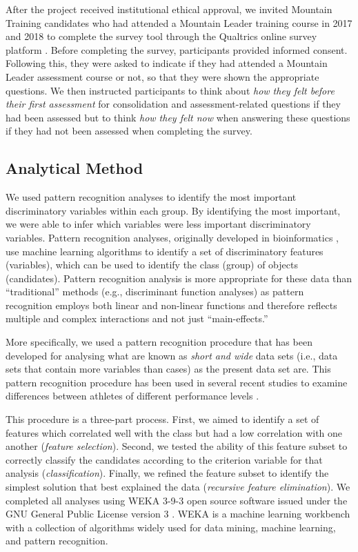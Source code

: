 \documentclass[
  12pt,
  a4paper,
]{book}
\begin{document}
After the project received institutional ethical approval, we invited Mountain Training candidates who had attended a Mountain Leader training course in 2017 and 2018 to complete the survey tool through the Qualtrics online survey platform \citep{Qualtrics}. Before completing the survey, participants provided informed consent. Following this, they were asked to indicate if they had attended a Mountain Leader assessment course or not, so that they were shown the appropriate questions. We then instructed participants to think about \emph{how they felt before their first assessment} for consolidation and assessment-related questions if they had been assessed but to think \emph{how they felt now} when answering these questions if they had not been assessed when completing the survey.

\hypertarget{pra-analytical-method}{%
\subsection{Analytical Method}\label{pra-analytical-method}}

We used pattern recognition analyses to identify the most important discriminatory variables within each group. By identifying the most important, we were able to infer which variables were less important discriminatory variables. Pattern recognition analyses, originally developed in bioinformatics \citep{Duda2000}, use machine learning algorithms to identify a set of discriminatory features (variables), which can be used to identify the class (group) of objects (candidates). Pattern recognition analysis is more appropriate for these data than ``traditional'' methods (e.g., discriminant function analyses) as pattern recognition employs both linear and non-linear functions and therefore reflects multiple and complex interactions and not just ``main-effects.''

More specifically, we used a pattern recognition procedure that has been developed for analysing what are known as \emph{short and wide} data sets (i.e., data sets that contain more variables than cases) as the present data set are. This pattern recognition procedure has been used in several recent studies to examine differences between athletes of different performance levels \citep[e.g.,][]{Gullich2019, Jones2019a, Jones2019b, Jones2020}.

This procedure is a three-part process. First, we aimed to identify a set of features which correlated well with the class but had a low correlation with one another (\emph{feature selection}). Second, we tested the ability of this feature subset to correctly classify the candidates according to the criterion variable for that analysis (\emph{classification}). Finally, we refined the feature subset to identify the simplest solution that best explained the data (\emph{recursive feature elimination}). We completed all analyses using WEKA 3-9-3 open source software issued under the GNU General Public License version 3 \citep{Bouckaert2018, Frank2016}. WEKA is a machine learning workbench with a collection of algorithms widely used for data mining, machine learning, and pattern recognition.
\end{document}
